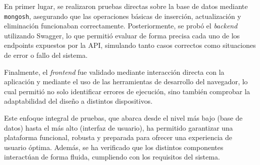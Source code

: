 En primer lugar, se realizaron pruebas directas sobre la base de datos mediante \texttt{mongosh}, asegurando que las operaciones básicas de inserción, actualización y eliminación funcionaban correctamente. Posteriormente, se probó el \textit{backend} utilizando Swagger, lo que permitió evaluar de forma precisa cada uno de los endpoints expuestos por la API, simulando tanto casos correctos como situaciones de error o fallo del sistema.

Finalmente, el \textit{frontend} fue validado mediante interacción directa con la aplicación y mediante el uso de las herramientas de desarrollo del navegador, lo cual permitió no solo identificar errores de ejecución, sino también comprobar la adaptabilidad del diseño a distintos dispositivos.

Este enfoque integral de pruebas, que abarca desde el nivel más bajo (base de datos) hasta el más alto (interfaz de usuario), ha permitido garantizar una plataforma funcional, robusta y preparada para ofrecer una experiencia de usuario óptima. Además, se ha verificado que los distintos componentes interactúan de forma fluida, cumpliendo con los requisitos del sistema.

